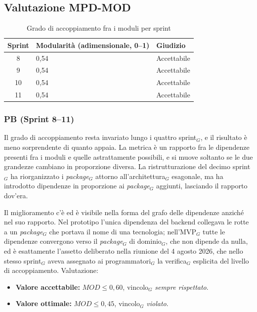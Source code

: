 \documentclass[a4paper, 10pt, colorlinks=true, linkcolor=black, urlcolor=blue, citecolor=blue, hidelinks]{article}
\begin{document}
\subsection{Valutazione MPD-MOD}
\begin{table}[H]
    \centering
	\begin{tabular}{|c|l|p{3cm}|}
		\hline
		\textbf{Sprint} & \textbf{Modularità (adimensionale, 0--1)} & \textbf{Giudizio} \\
		\hline
		8 & 0,54 & Accettabile \\
		\hline
        9 & 0,54 & Accettabile \\
        \hline
        10 & 0,54 & Accettabile \\
        \hline
        11 & 0,54 & Accettabile \\
        \hline
	\end{tabular}
	\caption{Grado di accoppiamento fra i moduli per sprint}
	\label{tab:mpd-mod}
\end{table}
\subsubsection{PB (Sprint 8--11)}
Il grado di accoppiamento resta invariato lungo i quattro sprint$_G$, e il risultato è meno sorprendente di quanto appaia. La metrica è un rapporto fra le dipendenze presenti fra i moduli e quelle astrattamente possibili, e si muove soltanto se le due grandezze cambiano in proporzione diversa. La ristrutturazione del decimo sprint$_G$ ha riorganizzato i \textit{package}$_G$ attorno all'architettura$_G$ esagonale, ma ha introdotto dipendenze in proporzione ai \textit{package}$_G$ aggiunti, lasciando il rapporto dov'era.

Il miglioramento c'è ed è visibile nella forma del grafo delle dipendenze anziché nel suo rapporto. Nel prototipo l'unica dipendenza del backend collegava le rotte a un \textit{package}$_G$ che portava il nome di una tecnologia; nell'MVP$_G$ tutte le dipendenze convergono verso il \textit{package}$_G$ di dominio$_G$, che non dipende da nulla, ed è esattamente l'assetto deliberato nella riunione del 4 agosto 2026, che nello stesso sprint$_G$ aveva assegnato ai programmatori$_G$ la verifica$_G$ esplicita del livello di accoppiamento. Valutazione:
\begin{itemize}
    \item \textbf{Valore accettabile:} $MOD \leq 0{,}60$, vincolo$_G$ \textit{sempre rispettato}.
    \item \textbf{Valore ottimale:} $MOD \leq 0{,}45$, vincolo$_G$ \textit{violato}.
\end{itemize}
\end{document}
